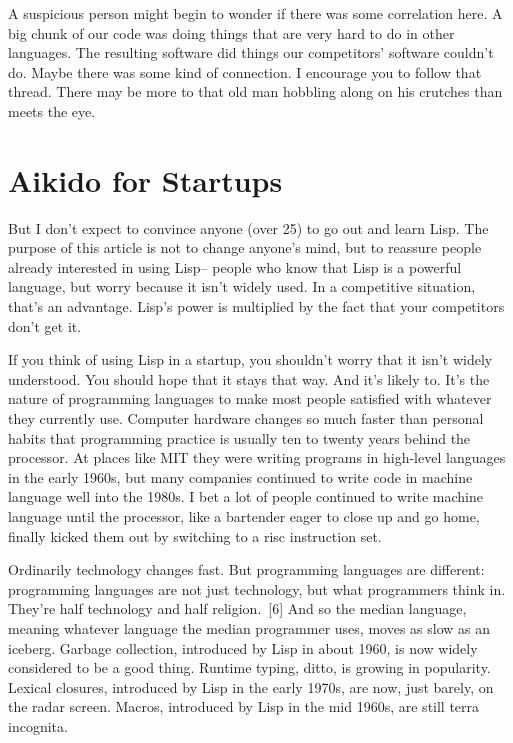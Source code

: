 \documentclass[10pt,twoside,openright]{memoir}
\begin{document}
A suspicious person might begin to wonder if there was some correlation here. A big chunk of our code was doing things that are very hard to do in other languages. The resulting software did things our competitors' software couldn't do. Maybe there was some kind of connection. I encourage you to follow that thread. There may be more to that old man hobbling along on his crutches than meets the eye.

\section{Aikido for Startups}

But I don't expect to convince anyone (over 25) to go out and learn Lisp. The purpose of this article is not to change anyone's mind, but to reassure people already interested in using Lisp-- people who know that Lisp is a powerful language, but worry because it isn't widely used. In a competitive situation, that's an advantage. Lisp's power is multiplied by the fact that your competitors don't get it.

If you think of using Lisp in a startup, you shouldn't worry that it isn't widely understood. You should hope that it stays that way. And it's likely to. It's the nature of programming languages to make most people satisfied with whatever they currently use. Computer hardware changes so much faster than personal habits that programming practice is usually ten to twenty years behind the processor. At places like MIT they were writing programs in high-level languages in the early 1960s, but many companies continued to write code in machine language well into the 1980s. I bet a lot of people continued to write machine language until the processor, like a bartender eager to close up and go home, finally kicked them out by switching to a risc instruction set.

Ordinarily technology changes fast. But programming languages are different: programming languages are not just technology, but what programmers think in. They're half technology and half religion.~[6] And so the median language, meaning whatever language the median programmer uses, moves as slow as an iceberg. Garbage collection, introduced by Lisp in about 1960, is now widely considered to be a good thing. Runtime typing, ditto, is growing in popularity. Lexical closures, introduced by Lisp in the early 1970s, are now, just barely, on the radar screen. Macros, introduced by Lisp in the mid 1960s, are still terra incognita.
\end{document}
